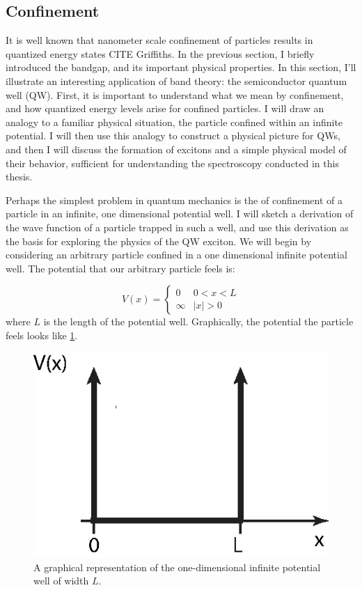 \newpage
\subsection{Confinement}
\indent It is well known that nanometer scale confinement of particles results in quantized energy states CITE Griffiths. In the previous section, I briefly introduced the bandgap, and its important physical properties. In this section, I'll illustrate an interesting application of band theory: the semiconductor quantum well (QW). First, it is important to understand what we mean by confinement, and how quantized energy levels arise for confined particles. I will draw an analogy to a familiar physical situation, the particle confined within an infinite potential. I will then use this analogy to construct a physical picture for QWs, and then I will discuss the formation of excitons and a simple physical model of their behavior, sufficient for understanding the spectroscopy conducted in this thesis.

\indent Perhaps the simplest problem in quantum mechanics is the of confinement of a particle in an infinite, one dimensional potential well. I will sketch a derivation of the wave function of a particle trapped in such a well, and use this derivation as the basis for exploring the physics of the QW exciton. We will begin by considering an arbitrary particle confined in a one dimensional infinite potential well. The potential that our arbitrary particle feels is:

\[ V(x) = \begin{cases} 
      0 & 0 < x < L \\
      \infty & |x| > 0 
   \end{cases}
\]
where $L$ is the length of the potential well. Graphically, the potential the particle feels looks like \ref{infp}.

\begin{figure}[h!]
\label{infp}
\centering
\includegraphics[width = .6\textwidth]{infpotential.eps}
\caption{\doublespacing A graphical representation of the one-dimensional infinite potential well of width $L$.}
\end{figure}

